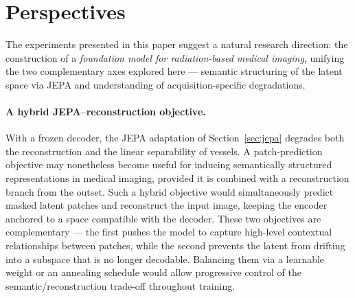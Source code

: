 \documentclass[conference]{IEEEtran}
\begin{document}
\section{Perspectives}

The experiments presented in this paper suggest a natural research direction: the construction of a \emph{foundation model for radiation-based medical imaging}, unifying the two complementary axes explored here --- semantic structuring of the latent space via JEPA and understanding of acquisition-specific degradations.

\paragraph{A hybrid JEPA--reconstruction objective.}
With a frozen decoder, the JEPA adaptation of Section~\ref{sec:jepa} degrades both the reconstruction and the linear separability of vessels. A patch-prediction objective may nonetheless become useful for inducing semantically structured representations in medical imaging, provided it is combined with a reconstruction branch from the outset. Such a hybrid objective would simultaneously predict masked latent patches and reconstruct the input image, keeping the encoder anchored to a space compatible with the decoder. These two objectives are complementary --- the first pushes the model to capture high-level contextual relationships between patches, while the second prevents the latent from drifting into a subspace that is no longer decodable. Balancing them via a learnable weight or an annealing schedule would allow progressive control of the semantic/reconstruction trade-off throughout training.
\end{document}

